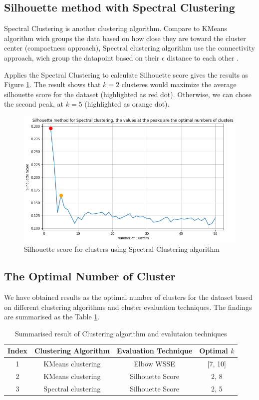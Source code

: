 \subsection{Silhouette method with Spectral Clustering}
Spectral Clustering is another clustering algorithm.
Compare to KMeans algorithm wich groups the data based on how close they are toward the cluster center (compactness approach), Spectral clustering algorithm use the connectivity approach, wich group the datapoint based on their $\epsilon$ distance to each other \cite{liu2018spectral}.

Applies the Spectral Clustering to calculate Silhouette score gives the results as Figure \ref{Fig: Sil Spec}.
The result shows that $k=2$ clusteres would maximize the average silhouette score for the dataset (highlighted as red dot).
Otherwise, we can chose the second peak, at $k = 5$ (highlighted as orange dot).

\begin{figure}
    \includegraphics[width=\textwidth]{Appendices/Sil-Spec.png}
    \caption{Silhouette score for clusters using Spectral Clustering algorithm}
    \label{Fig: Sil Spec}
\end{figure}

\subsection{The Optimal Number of Cluster}
We have obtained results as the optimal number of clusters for the dataset based on different clustering algorithms and cluster evaluation techniques.
The findings are summarised as the Table \ref{Tab: cluster and eva result}.
\begin{table}
    \centering
    \begin{tabular}{||c c c c||}
        \hline
        Index & Clustering Algorithm & Evaluation Technique & Optimal $k$ \\
        \hline \hline
        1     & KMeans clustering    & Elbow WSSE           & [7, 10]     \\
        2     & KMeans clustering    & Silhouette Score     & 2, 8        \\
        3     & Spectral clustering  & Silhouette Score     & 2, 5        \\
        \hline
    \end{tabular}
    \caption{Summarised result of Clustering algorithm and evalutaion techniques}
    \label{Tab: cluster and eva result}
\end{table}


